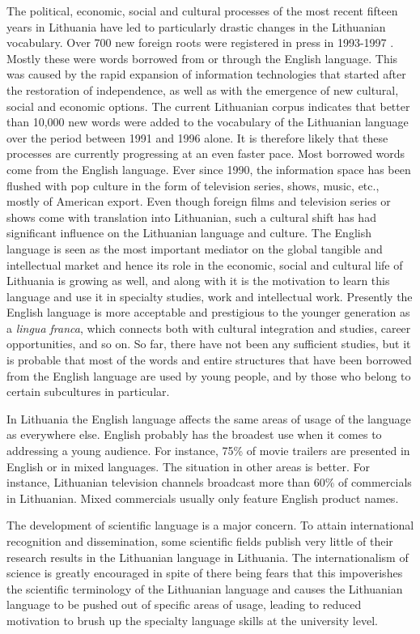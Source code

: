 \documentclass[]{../metanetpaper}
\begin{document}
\begin{multicols}{2}
The political, economic, social and cultural processes of the most recent fifteen years in Lithuania have led to particularly drastic changes in the Lithuanian vocabulary. Over 700 new foreign roots were registered in press in 1993-1997 \cite{nbi1}.  Mostly these were words borrowed from or through the English language. This was caused by the rapid expansion of information technologies that started after the restoration of independence, as well as with the emergence of new cultural, social and economic options. The current Lithuanian corpus indicates that better than 10,000 new words were added to the vocabulary of the Lithuanian language over the period between 1991 and 1996 alone. It is therefore likely that these processes are currently progressing at an even faster pace. Most borrowed words come from the English language. Ever since 1990, the information space has been flushed with pop culture in the form of television series, shows, music, etc., mostly of American export. Even though foreign films and television series or shows come with translation into Lithuanian, such a cultural shift has had significant influence on the Lithuanian language and culture. The English language is seen as the most important mediator on the global tangible and intellectual market and hence its role in the economic, social and cultural life of Lithuania is growing as well, and along with it is the motivation to learn this language and use it in specialty studies, work and intellectual work. Presently the English language is more acceptable and prestigious to the younger generation as a \textit{lingua franca}, which connects both with cultural integration and studies, career opportunities, and so on. So far, there have not been any sufficient studies, but it is probable that most of the words and entire structures that have been borrowed from the English language are used by young people, and by those who belong to certain subcultures in particular.

In Lithuania the English language affects the same areas of usage of the language as everywhere else. English probably has the broadest use when it comes to addressing a young audience. For instance, 75\% of movie trailers are presented in English or in mixed languages. The situation in other areas is better. For instance, Lithuanian television channels broadcast more than 60\% of commercials in Lithuanian. Mixed commercials usually only feature English product names\cite{nbi2}.

The development of scientific language is a major concern. To attain international recognition and dissemination, some scientific fields publish very little of their research results in the Lithuanian language in Lithuania. The internationalism of science is greatly encouraged in spite of there being fears that this impoverishes the scientific terminology of the Lithuanian language and causes the Lithuanian language to be pushed out of specific areas of usage, leading to reduced motivation to brush up the specialty language skills at the university level.


\end{multicols}
\end{document}
